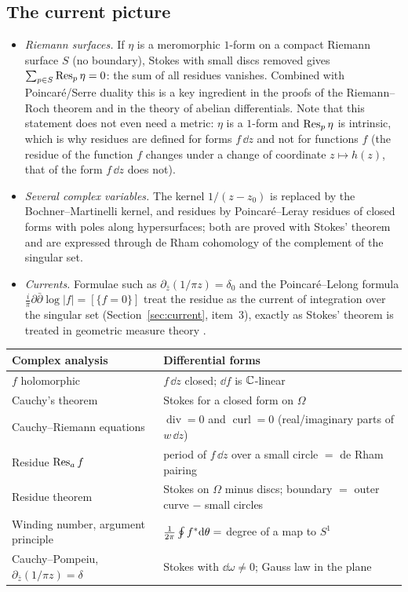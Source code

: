\subsection{The current picture}\label{sec:rescurrent}

\begin{itemize}
\item \emph{Riemann surfaces.} If $\eta$ is a meromorphic $1$-form on a compact Riemann surface $S$ (no boundary), Stokes with small discs removed gives $\sum_{p\in S}\operatorname{Res}_p\eta=0$: the sum of all residues vanishes. Combined with Poincar\'e/Serre duality this is a key ingredient in the proofs of the Riemann--Roch theorem and in the theory of abelian differentials. Note that this statement does not even need a metric: $\eta$ is a $1$-form and $\operatorname{Res}_p\eta$ is intrinsic, which is why residues are defined for forms $f\,\dd z$ and not for functions $f$ (the residue of the function $f$ changes under a change of coordinate $z\mapsto h(z)$, that of the form $f\,\dd z$ does not).
\item \emph{Several complex variables.} The kernel $1/(z-z_0)$ is replaced by the Bochner--Martinelli kernel, and residues by Poincar\'e--Leray residues of closed forms with poles along hypersurfaces; both are proved with Stokes' theorem and are expressed through de Rham cohomology of the complement of the singular set.
\item \emph{Currents.} Formulae such as $\partial_{\bar z}(1/\pi z)=\delta_0$ and the Poincar\'e--Lelong formula $\frac i\pi\partial\bar\partial\log|f|=[\{f=0\}]$ treat the residue as the current of integration over the singular set (Section~\ref{sec:current}, item~3), exactly as Stokes' theorem is treated in geometric measure theory \cite{GriffithsHarris}.
\end{itemize}

\begin{center}
\small
\renewcommand{\arraystretch}{1.3}
\begin{tabular}{@{}p{4.6cm}p{9.6cm}@{}}
\toprule
\textbf{Complex analysis} & \textbf{Differential forms}\\
\midrule
$f$ holomorphic & $f\,\dd z$ closed; $\dd f$ is $\mathbb{C}$-linear\\
Cauchy's theorem & Stokes for a closed form on $\Omega$\\
Cauchy--Riemann equations & $\operatorname{div}=0$ and $\operatorname{curl}=0$ (real/imaginary parts of $w\,\dd z$)\\
Residue $\operatorname{Res}_af$ & period of $f\,\dd z$ over a small circle $=$ de Rham pairing\\
Residue theorem & Stokes on $\Omega$ minus discs; boundary $=$ outer curve $-$ small circles\\
Winding number, argument principle & $\frac1{2\pi}\oint f{}^{*}\mathrm{d}\theta=$ degree of a map to $S^1$\\
Cauchy--Pompeiu, $\partial_{\bar z}(1/\pi z)=\delta$ & Stokes with $\dd\omega\neq0$; Gauss law in the plane\\
\bottomrule
\end{tabular}
\end{center}
